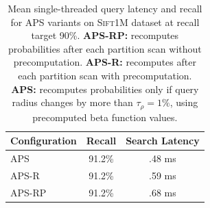\begin{table}[t]
\small
\centering
\caption{Mean single-threaded query latency and recall for APS variants on \textsc{Sift1M} dataset at recall target 90\%. \textbf{APS-RP:} recomputes probabilities after each partition scan without precomputation. \textbf{APS-R:} recomputes after each partition scan with precomputation. \textbf{APS:} recomputes probabilities only if query radius changes by more than $\tau_{\rho}=1\%$, using precomputed beta function values.}
\label{tab:recall_overhead}
\begin{tabular}{|l|c|c|}
\hline
\textbf{Configuration} & Recall & Search Latency \\ \hline
APS      & 91.2\%   & .48 ms                      \\ \hline
APS-R    & 91.2\% & .59 ms                         \\ \hline
APS-RP   & 91.2\% & .68 ms                         \\ \hline
\end{tabular}
\end{table}
